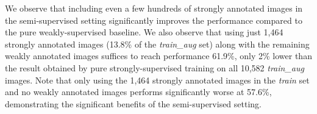 We observe that including even a few hundreds of strongly annotated
images in the semi-supervised setting significantly improves the 
performance compared to the pure weakly-supervised baseline. We also
observe that using just 1,464 strongly annotated images (13.8\% of the
\textsl{train\_aug} set) along with the remaining weakly annotated
images suffices to reach performance 61.9\%, only 2\% lower than the
result obtained by pure strongly-supervised training on all 10,582
\textsl{train\_aug} images. Note that only using the 1,464 strongly
annotated images in the \textsl{train} set and no weakly annotated
images performs significantly worse at 57.6\%, demonstrating the
significant benefits of the semi-supervised setting.

\begin{table}[t]
  \centering
  \caption{DeepLab-CRF VOC 2012 \textsl{val} IOU (\%) performance
    using both strong pixel-level and weak image-level annotations.}
  \label{tab:strong_weak_annot}
\end{table}



